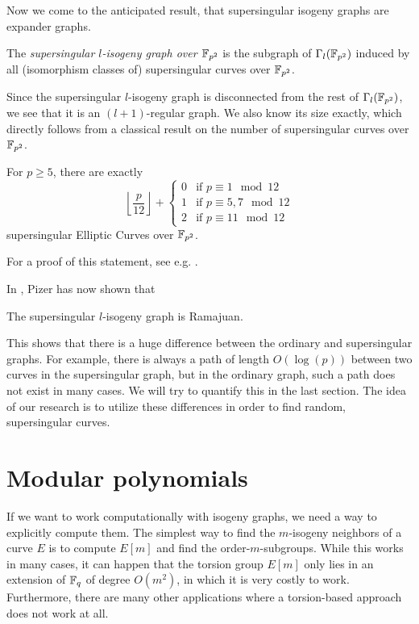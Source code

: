 Now we come to the anticipated result, that supersingular isogeny graphs are expander graphs.
\begin{definition}
    The \emph{supersingular $l$-isogeny graph over $\mathbb{F}_{p^2}$} is the subgraph of $\Gamma_l(\mathbb{F}_{p^2})$ induced by all (isomorphism classes of) supersingular curves over $\mathbb{F}_{p^2}$.
\end{definition}
Since the supersingular $l$-isogeny graph is disconnected from the rest of $\Gamma_l(\mathbb{F}_{p^2})$, we see that it is an $(l + 1)$-regular graph.
We also know its size exactly, which directly follows from a classical result on the number of supersingular curves over $\mathbb{F}_{p^2}$.
\begin{prop}
    For $p \geq 5$, there are exactly
    \begin{equation*}
        \left\lfloor \frac p {12} \right\rfloor + \begin{cases}
            0 & \text{if $p \equiv 1 \mod 12$} \\
            1 & \text{if $p \equiv 5, 7 \mod 12$} \\
            2 & \text{if $p \equiv 11 \mod 12$}
        \end{cases}
    \end{equation*}
    supersingular Elliptic Curves over $\mathbb{F}_{p^2}$.
\end{prop}
For a proof of this statement, see e.g. \cite[Thm~V.4.1]{arithmetic_elliptic_curves}.

In \cite{supersingular_graphs_ramajuan}, Pizer has now shown that
\begin{theorem}
    \label{prop:supersingular_graph_ramajuan}
    The supersingular $l$-isogeny graph is Ramajuan.
\end{theorem}
This shows that there is a huge difference between the ordinary and supersingular graphs.
For example, there is always a path of length $O(\log(p))$ between two curves in the supersingular graph, but in the ordinary graph, such a path does not exist in many cases.
We will try to quantify this in the last section.
The idea of our research is to utilize these differences in order to find random, supersingular curves.

\section{Modular polynomials}
If we want to work computationally with isogeny graphs, we need a way to explicitly compute them.
The simplest way to find the $m$-isogeny neighbors of a curve $E$ is to compute $E[m]$ and find the order-$m$-subgroups.
While this works in many cases, it can happen that the torsion group $E[m]$ only lies in an extension of $\mathbb{F}_q$ of degree $O(m^2)$, in which it is very costly to work.
Furthermore, there are many other applications where a torsion-based approach does not work at all.

